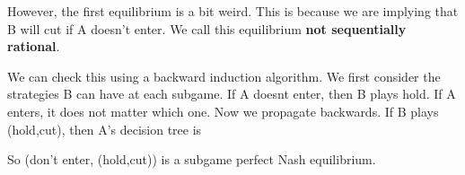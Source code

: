 However, the first equilibrium is a bit weird. This is because we are implying that B will cut if A doesn't enter. We call this equilibrium \textbf{not sequentially rational}.

We can check this using a backward induction algorithm. 
We first consider the strategies B can have at each subgame. If A doesnt enter, then B plays hold. If A enters, it does not matter which one. Now we propagate backwards. If B plays (hold,cut), then A's decision tree is 
\begin{center}
    \end{center}
So (don't enter, (hold,cut)) is a subgame perfect Nash equilibrium.

